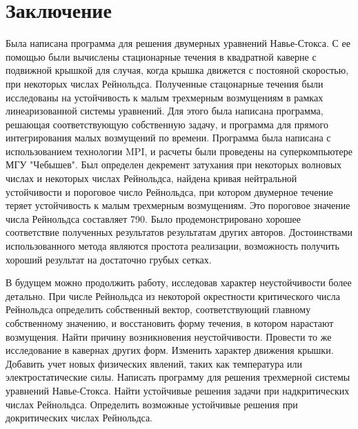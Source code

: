 \documentclass{scrartcl}
\begin{document}
\section*{Заключение}
	Была написана программа для решения двумерных уравнений Навье-Стокса. С ее помощью были вычислены стационарные течения в квадратной каверне с подвижной крышкой для случая, когда крышка движется с постояной скоростью, при некоторых числах Рейнольдса. Полученные стацонарные течения были исследованы на устойчивость к малым трехмерным возмущениям в рамках линеаризованной системы уравнений. Для этого была написана программа, решающая соответствующую собственную задачу, и программа для прямого интегрирования малых возмущений по времени. Программа была написана с использованием технологии MPI, и расчеты были проведены на суперкомпьютере МГУ "Чебышев". Был определен декремент затухания при некоторых волновых числах и некоторых числах Рейнольдса, найдена кривая нейтральной устойчивости и пороговое число Рейнольдса, при котором двумерное течение теряет устойчивость к малым трехмерным возмущениям. Это пороговое значение числа Рейнольдса составляет 790. Было продемонстрировано хорошее соответствие полученных результатов результатам других авторов. Достоинствами использованного метода являются простота реализации, возможность получить хороший результат на достаточно грубых сетках. 


В будущем можно продолжить работу, исследовав характер неустойчивости более детально. При числе Рейнольдса из некоторой окрестности критического числа Рейнольдса определить собственный вектор, соответствующий главному собственному значению, и восстановить форму течения, в котором нарастают возмущения. Найти причину возникновения неустойчивости. 
Провести то же исследование в кавернах других форм. Изменить характер движения крышки. Добавить учет новых физических явлений, таких как температура или электростатические силы. Написать программу для решения трехмерной системы уравнений Навье-Стокса. Найти устойчивые решения задачи при надкритических числах Рейнольдса. Определить возможные устойчивые решения при докритических числах Рейнольдса. 

  
\end{document}
